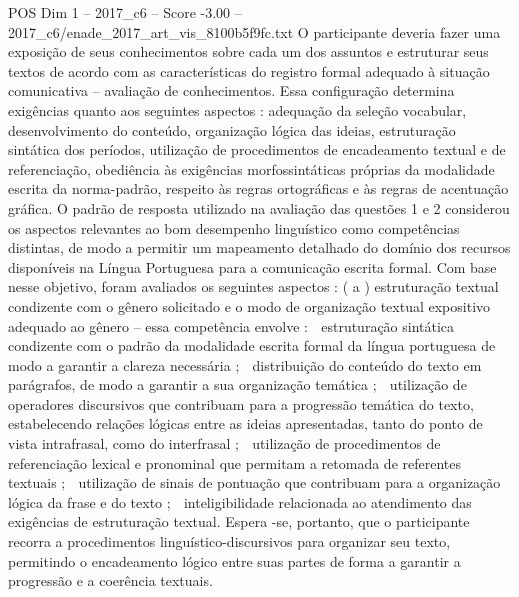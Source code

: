 \begin{textsample}{POS Dim 1 – 2017\_c6 – Score -3.00 – 2017\_c6/enade\_2017\_art\_vis\_8100b5f9fc.txt}
O participante deveria fazer uma exposição de seus conhecimentos sobre cada um dos assuntos e estruturar seus textos de acordo com as características do registro formal adequado à situação comunicativa – avaliação de conhecimentos.
Essa configuração determina exigências quanto aos seguintes aspectos : adequação da seleção vocabular, desenvolvimento do conteúdo, organização lógica das ideias, estruturação sintática dos períodos, utilização de procedimentos de encadeamento textual e de referenciação, obediência às exigências morfossintáticas próprias da modalidade escrita da norma-padrão, respeito às regras ortográficas e às regras de acentuação gráfica.
O padrão de resposta utilizado na avaliação das questões 1 e 2 considerou os aspectos relevantes ao bom desempenho linguístico como competências distintas, de modo a permitir um mapeamento detalhado do domínio dos recursos disponíveis na Língua Portuguesa para a comunicação escrita formal.
Com base nesse objetivo, foram avaliados os seguintes aspectos : ( a ) estruturação textual condizente com o gênero solicitado e o modo de organização textual expositivo adequado ao gênero – essa competência envolve :  estruturação sintática condizente com o padrão da modalidade escrita formal da língua portuguesa de modo a garantir a clareza necessária ;  distribuição do conteúdo do texto em parágrafos, de modo a garantir a sua organização temática ;  utilização de operadores discursivos que contribuam para a progressão temática do texto, estabelecendo relações lógicas entre as ideias apresentadas, tanto do ponto de vista intrafrasal, como do interfrasal ;  utilização de procedimentos de referenciação lexical e pronominal que permitam a retomada de referentes textuais ;  utilização de sinais de pontuação que contribuam para a organização lógica da frase e do texto ;  inteligibilidade relacionada ao atendimento das exigências de estruturação textual.
Espera -se, portanto, que o participante recorra a procedimentos linguístico-discursivos para organizar seu texto, permitindo o encadeamento lógico entre suas partes de forma a garantir a progressão e a coerência textuais.

\end{textsample}
